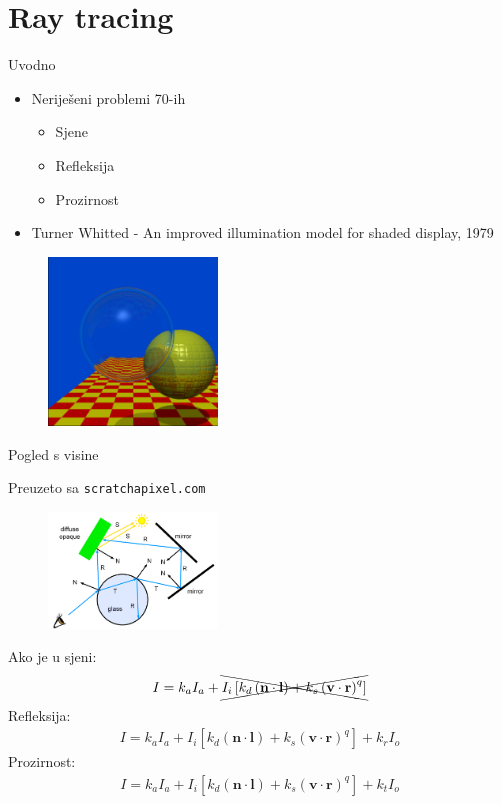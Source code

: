 \documentclass[9pt]{beamer}
\begin{document}
\section{Ray tracing}
\begin{frame}{Uvodno}
\begin{itemize}
	\item Neriješeni problemi 70-ih
	\begin{itemize}
		\item Sjene
		\item Refleksija
		\item Prozirnost
	\end{itemize}
	\item Turner Whitted - An improved illumination model for shaded display, 1979
\end{itemize}
\begin{figure}
	\includegraphics[width=0.4\textwidth]{./slike/whitted-spheres.jpg}
\end{figure}
\end{frame}

\begin{frame}{Pogled s visine}
\begin{tiny}
	Preuzeto sa \texttt{scratchapixel.com}
\end{tiny}

\begin{figure}
	\includegraphics[width=0.4\textwidth]{./slike/rt-whitted-example}	
\end{figure}
Ako je u sjeni:
\begin{align*}
I = k_aI_a + \xcancel{I_i\left[k_d\left(\mathbf{n}\cdot\mathbf{l}\right)+
k_s\left(\mathbf{v}\cdot\mathbf{r}\right)^q\right]}
\end{align*}
Refleksija:
\begin{align*}
I = k_aI_a + I_i\left[k_d\left(\mathbf{n}\cdot\mathbf{l}\right)+
	k_s\left(\mathbf{v}\cdot\mathbf{r}\right)^q\right] + k_rI_o
\end{align*}
Prozirnost:
\begin{align*}
I = k_aI_a + I_i\left[k_d\left(\mathbf{n}\cdot\mathbf{l}\right)+
k_s\left(\mathbf{v}\cdot\mathbf{r}\right)^q\right] + k_tI_o
\end{align*}
\end{frame}
\end{document}
